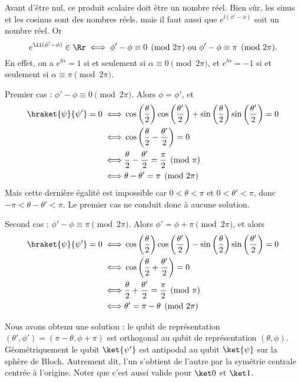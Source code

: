 \documentclass[11pt,class=report,crop=false]{standalone}
\begin{document}
Avant d'être nul, ce produit scalaire doit être un nombre réel.
Bien sûr, les sinus et les cosinus sont des nombres réels, 
mais il faut aussi que $e^{\ii(\phi'-\phi)}$ soit un nombre réel.
Or 
$$e^{\ii(\phi'-\phi)} \in \Rr \iff \phi'-\phi \equiv 0 \pmod{2\pi} \text{ ou } \phi'-\phi \equiv \pi \pmod{2\pi}.$$
En effet, on a  $e^{\ii\alpha} = 1$ si et seulement si $\alpha \equiv 0 \pmod{2\pi}$,
et  $e^{\ii\alpha} = -1$ si et seulement si $\alpha \equiv \pi \pmod{2\pi}$.

Premier cas : $\phi'-\phi \equiv 0 \pmod{2\pi}$. Alors $\phi=\phi'$, et
\begin{align*}
\braket{\psi}{\psi'} = 0
\iff& \cos\left(\frac\theta2\right)\cos\left(\frac{\theta'}2\right)
+ \sin\left(\frac\theta2\right)\sin\left(\frac{\theta'}2\right) = 0 \\
\iff& \cos\left(\frac\theta2-\frac{\theta'}2\right) = 0 \\
\iff& \frac\theta2-\frac{\theta'}2 = \frac\pi2 \pmod{\pi} \\
\iff& \theta-\theta' = \pi \pmod{2\pi} \\
\end{align*}
Mais cette dernière égalité est impossible car $0<\theta<\pi$ et $0<\theta'<\pi$, donc $-\pi<\theta-\theta'<\pi$.
Le premier cas ne conduit donc à aucune solution.

Second cas : $\phi'-\phi \equiv \pi \pmod{2\pi}$. Alors $\phi'=\phi+\pi \pmod{2\pi}$, et alors 
\begin{align*}
\braket{\psi}{\psi'} = 0 
\iff& \cos\left(\frac\theta2\right)\cos\left(\frac{\theta'}2\right)
- \sin\left(\frac\theta2\right)\sin\left(\frac{\theta'}2\right) = 0 \\
\iff& \cos\left(\frac\theta2+\frac{\theta'}2\right) = 0 \\
\iff& \frac\theta2+\frac{\theta'}2 = \frac\pi2 \pmod{\pi} \\
\iff& \theta' = \pi - \theta \pmod{2\pi} \\
\end{align*}

Nous avons obtenu une solution : le qubit de représentation $(\theta',\phi') = (\pi-\theta,\phi+\pi)$ est orthogonal au qubit de représentation $(\theta,\phi)$.
Géométriquement le qubit $\ket{\psi'}$ est antipodal au qubit $\ket{\psi}$ sur la sphère de Bloch. Autrement dit, l'un s'obtient de l'autre par la symétrie centrale centrée à l'origine.
Noter que c'est aussi valide pour $\ket0$ et $\ket1$.
\end{document}
